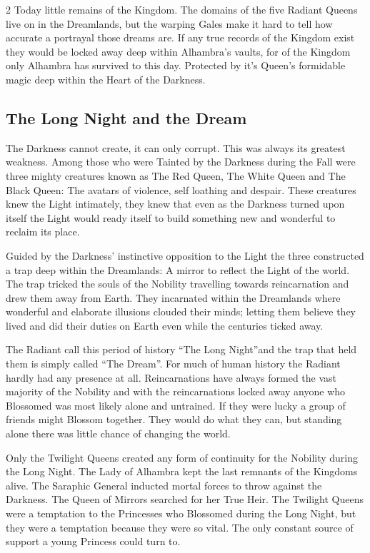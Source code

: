 \begin{multicols}{2}
Today little remains of the Kingdom. The domains of the five Radiant Queens live on in the Dreamlands, but the warping Gales make it hard to tell how accurate a portrayal those dreams are. If any true records of the Kingdom exist they would be locked away deep within Alhambra's vaults, for of the Kingdom only Alhambra has survived to this day. Protected by it's Queen's formidable magic deep within the Heart of the Darkness. 

\subsection*{The Long Night and the Dream}%

The Darkness cannot create, it can only corrupt. This was always its greatest weakness. Among those who were Tainted by the Darkness during the Fall were three mighty creatures known as The Red Queen, The White Queen and The Black Queen: The avatars of violence, self loathing and despair. These creatures knew the Light intimately, they knew that even as the Darkness turned upon itself the Light would ready itself to build something new and wonderful to reclaim its place.

Guided by the Darkness' instinctive opposition to the Light the three constructed a trap deep within the Dreamlands: A mirror to reflect the Light of the world. The trap tricked the souls of the Nobility travelling towards reincarnation and drew them away from Earth. They incarnated within the Dreamlands where wonderful and elaborate illusions clouded their minds; letting them believe they lived and did their duties on Earth even while the centuries ticked away.

The Radiant call this period of history \textquotedblleft The Long Night\textquotedblright and the trap that held them is simply called \textquotedblleft The Dream\textquotedblright. For much of human history the Radiant hardly had any presence at all. Reincarnations have always formed the vast majority of the Nobility and with the reincarnations locked away anyone who Blossomed was most likely alone and untrained. If they were lucky a group of friends might Blossom together. They would do what they can, but standing alone there was little chance of changing the world.

Only the Twilight Queens created any form of continuity for the Nobility during the Long Night. The Lady of Alhambra kept the last remnants of the Kingdoms alive. The Saraphic General inducted mortal forces to throw against the Darkness. The Queen of Mirrors searched for her True Heir. The Twilight Queens were a temptation to the Princesses who Blossomed during the Long Night, but they were a temptation because they were so vital. The only constant source of support a young Princess could turn to. 


\end{multicols}
